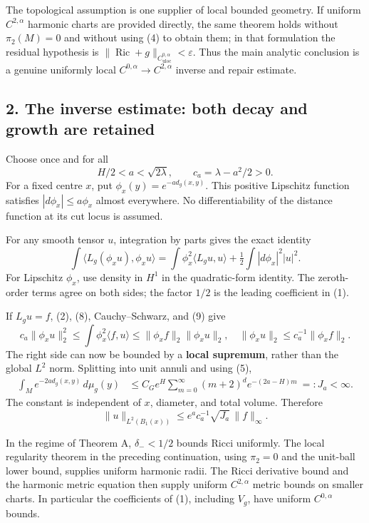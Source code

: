 \documentclass[
  11pt,
]{article}
\begin{document}
The topological assumption is one supplier of local bounded geometry. If
uniform \(C^{2,\alpha}\) harmonic charts are provided directly, the same
theorem holds without \(\pi_2(M)=0\) and without using (4) to obtain
them; in that formulation the residual hypothesis is
\(\|\operatorname{Ric}+g\|_{C^{0,\alpha}_{\mathrm{uloc}}}<\varepsilon\).
Thus the main analytic conclusion is a genuine uniformly local
\(C^{0,\alpha}\to C^{2,\alpha}\) inverse and repair estimate.

\hypertarget{the-inverse-estimate-both-decay-and-growth-are-retained}{%
\subsection{2. The inverse estimate: both decay and growth are
retained}\label{the-inverse-estimate-both-decay-and-growth-are-retained}}

Choose once and for all \[
 H/2<a<\sqrt{2\lambda},\qquad c_a=\lambda-a^2/2>0.             \tag{8}
\] For a fixed centre \(x\), put \(\phi_x(y)=e^{-a d_g(x,y)}\). This
positive Lipschitz function satisfies \(|d\phi_x|\le a\phi_x\) almost
everywhere. No differentiability of the distance function at its cut
locus is assumed.

For any smooth tensor \(u\), integration by parts gives the exact
identity \[
 \int\langle L_g(\phi_xu),\phi_xu\rangle
 =\int\phi_x^2\langle L_gu,u\rangle
       +\tfrac12\int|d\phi_x|^2|u|^2.                       \tag{9}
\] For Lipschitz \(\phi_x\), use density in \(H^1\) in the
quadratic-form identity. The zeroth-order terms agree on both sides; the
factor \(1/2\) is the leading coefficient in (1).

If \(L_gu=f\), (2), (8), Cauchy--Schwarz, and (9) give \[
 c_a\|\phi_xu\|_2^2
 \le\int\phi_x^2\langle f,u\rangle
 \le\|\phi_xf\|_2\|\phi_xu\|_2,
\quad
 \|\phi_xu\|_2\le c_a^{-1}\|\phi_xf\|_2.                    \tag{10}
\] The right side can now be bounded by a \textbf{local supremum},
rather than the global \(L^2\) norm. Splitting into unit annuli and
using (5), \[
 \begin{aligned}
 \int_M e^{-2a d_g(x,y)}\,d\mu_g(y)
 &\le C_G e^H\sum_{m=0}^{\infty}
            (m+2)^d e^{-(2a-H)m}\ =:J_a<\infty.
 \end{aligned}                                             \tag{11}
\] The constant is independent of \(x\), diameter, and total volume.
Therefore \[
 \|u\|_{L^2(B_1(x))}
        \le e^a c_a^{-1}\sqrt{J_a}\,\|f\|_\infty.             \tag{12}
\]

In the regime of Theorem A, \(\delta_-<1/2\) bounds Ricci uniformly. The
local regularity theorem in the preceding continuation, using
\(\pi_2=0\) and the unit-ball lower bound, supplies uniform harmonic
radii. The Ricci derivative bound and the harmonic metric equation then
supply uniform \(C^{2,\alpha}\) metric bounds on smaller charts. In
particular the coefficients of (1), including \(V_g\), have uniform
\(C^{0,\alpha}\) bounds.
\end{document}
